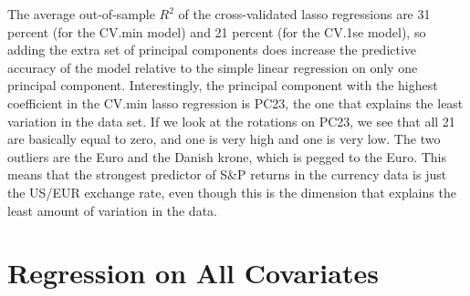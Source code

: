 \documentclass[11pt, fleqn]{article}
\begin{document}


The average out-of-sample $R^2$ of the cross-validated lasso regressions are 31 percent (for the CV.min model) and 21 percent (for the CV.1se model), so adding the extra set of principal components does increase the predictive accuracy of the model relative to the simple linear regression on only one principal component. Interestingly, the principal component with the highest coefficient in the CV.min lasso regression is PC23, the one that explains the least variation in the data set. If we look at the rotations on PC23, we see that all 21 are basically equal to zero, and one is very high and one is very low. The two outliers are the Euro and the Danish krone, which is pegged to the Euro. This means that the strongest predictor of S\&P returns in the currency data is just the US/EUR exchange rate, even though this is the dimension that explains the least amount of variation in the data.

\section{Regression on All Covariates} \label{sec:regall}
\end{document}
